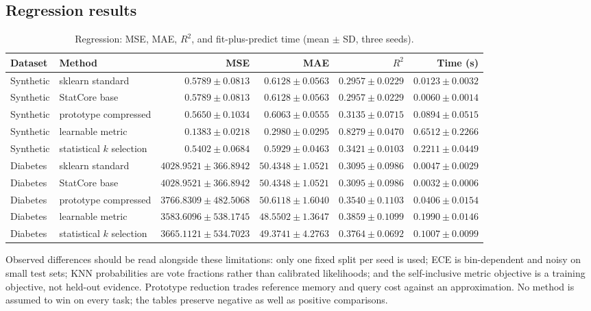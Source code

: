 \documentclass[conference]{IEEEtran}
\begin{document}
\subsection{Regression results}
\begin{table}[t]
\centering
\small\setlength{\tabcolsep}{3pt}
\caption{Regression: MSE, MAE, $R^2$, and fit-plus-predict time (mean $\pm$ SD, three seeds).}
\label{tab:reg-results}
\begin{tabular}{llrrrr}
\toprule
Dataset & Method & MSE & MAE & $R^2$ & Time (s)\\
\midrule
Synthetic & sklearn standard & $0.5789\pm0.0813$ & $0.6128\pm0.0563$ & $0.2957\pm0.0229$ & $0.0123\pm0.0032$\\
Synthetic & StatCore base & $0.5789\pm0.0813$ & $0.6128\pm0.0563$ & $0.2957\pm0.0229$ & $0.0060\pm0.0014$\\
Synthetic & prototype compressed & $0.5650\pm0.1034$ & $0.6063\pm0.0555$ & $0.3135\pm0.0715$ & $0.0894\pm0.0515$\\
Synthetic & learnable metric & $0.1383\pm0.0218$ & $0.2980\pm0.0295$ & $0.8279\pm0.0470$ & $0.6512\pm0.2266$\\
Synthetic & statistical $k$ selection & $0.5402\pm0.0684$ & $0.5929\pm0.0463$ & $0.3421\pm0.0103$ & $0.2211\pm0.0449$\\
Diabetes & sklearn standard & $4028.9521\pm366.8942$ & $50.4348\pm1.0521$ & $0.3095\pm0.0986$ & $0.0047\pm0.0029$\\
Diabetes & StatCore base & $4028.9521\pm366.8942$ & $50.4348\pm1.0521$ & $0.3095\pm0.0986$ & $0.0032\pm0.0006$\\
Diabetes & prototype compressed & $3766.8309\pm482.5068$ & $50.6118\pm1.6040$ & $0.3540\pm0.1103$ & $0.0406\pm0.0154$\\
Diabetes & learnable metric & $3583.6096\pm538.1745$ & $48.5502\pm1.3647$ & $0.3859\pm0.1099$ & $0.1990\pm0.0146$\\
Diabetes & statistical $k$ selection & $3665.1121\pm534.7023$ & $49.3741\pm4.2763$ & $0.3764\pm0.0692$ & $0.1007\pm0.0099$\\
\bottomrule
\end{tabular}
\end{table}

Observed differences should be read alongside these limitations: only one fixed split per seed is used; ECE is bin-dependent and noisy on small test sets; KNN probabilities are vote fractions rather than calibrated likelihoods; and the self-inclusive metric objective is a training objective, not held-out evidence. Prototype reduction trades reference memory and query cost against an approximation. No method is assumed to win on every task; the tables preserve negative as well as positive comparisons.
\end{document}
